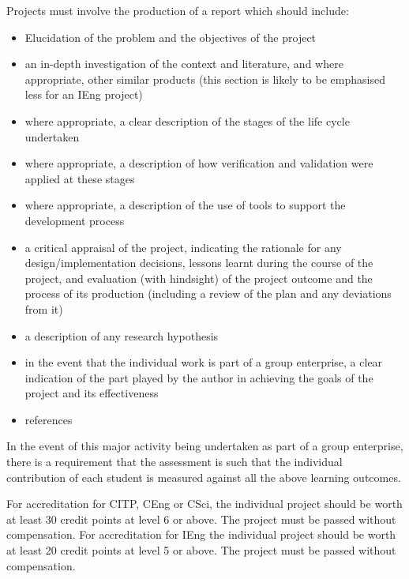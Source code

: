 \documentclass{../fal_assignment}
\begin{document}
Projects must involve the production of a report which should include:

\begin{itemize}
\item Elucidation of the problem and the objectives of the project
\item an in-depth investigation of the context and literature, and where appropriate, other similar products (this section is
likely to be emphasised less for an IEng project)
\item where appropriate, a clear description of the stages of the life cycle undertaken
\item where appropriate, a description of how verification and validation were applied at these stages
\item where appropriate, a description of the use of tools to support the development process
\item a critical appraisal of the project, indicating the rationale for any design/implementation decisions, lessons learnt
during the course of the project, and evaluation (with hindsight) of the project outcome and the process of its
production (including a review of the plan and any deviations from it)
\item a description of any research hypothesis
\item in the event that the individual work is part of a group enterprise, a clear indication of the part played by the author in
achieving the goals of the project and its effectiveness
\item references 
\end{itemize}

In the event of this major activity being undertaken as part of a group enterprise, there is a requirement that the
assessment is such that the individual contribution of each student is measured against all the above learning
outcomes.

For accreditation for CITP, CEng or CSci, the individual project should be worth at least 30 credit points at level 6 or
above. The project must be passed without compensation.
For accreditation for IEng the individual project should be worth at least 20 credit points at level 5 or above. The project
must be passed without compensation. 
\end{document}
